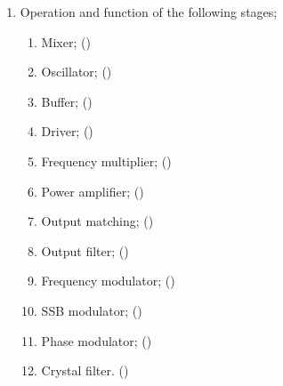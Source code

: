 \begin{flushleft}
\begin{enumerate}
\begin{enumerate}
\item Operation and function of the following stages;
\begin{enumerate}
\item Mixer; ()\label{HAREC.a.5.3.1}
\item Oscillator; ()\label{HAREC.a.5.3.2}
\item Buffer; ()\label{HAREC.a.5.3.3}
\item Driver; ()\label{HAREC.a.5.3.4}
\item Frequency multiplier; ()\label{HAREC.a.5.3.5}
\item Power amplifier; ()\label{HAREC.a.5.3.6}
\item Output matching; ()\label{HAREC.a.5.3.7}
\item Output filter; ()\label{HAREC.a.5.3.8}
\item Frequency modulator; ()\label{HAREC.a.5.3.9}
\item SSB modulator; ()\label{HAREC.a.5.3.10}
\item Phase modulator; ()\label{HAREC.a.5.3.11}
\item Crystal filter. ()\label{HAREC.a.5.3.12}
\end{enumerate}


\end{enumerate}
\end{enumerate}
\end{flushleft}
